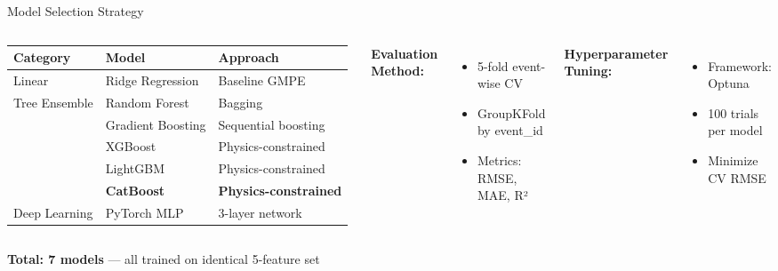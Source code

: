 \documentclass[aspectratio=169,11pt]{beamer}
\begin{document}
\begin{frame}{Model Selection Strategy}
\begin{columns}[T]
\begin{table}
\centering
\small
\begin{tabular}{@{}lll@{}}
\toprule
\textbf{Category} & \textbf{Model} & \textbf{Approach} \\
\midrule
Linear & Ridge Regression & Baseline GMPE \\[0.2cm]
\midrule
\multirow{5}{*}{Tree Ensemble} & Random Forest & Bagging \\
& Gradient Boosting & Sequential boosting \\
& XGBoost & Physics-constrained \\
& LightGBM & Physics-constrained \\
& \textbf{CatBoost} & \textbf{Physics-constrained} \\[0.2cm]
\midrule
Deep Learning & PyTorch MLP & 3-layer network \\
\bottomrule
\end{tabular}
\end{table}

\textbf{Evaluation Method:}
\begin{itemize}
    \item 5-fold event-wise CV
    \item GroupKFold by event\_id
    \item Metrics: RMSE, MAE, R²
\end{itemize}

\vspace{0.3cm}
\textbf{Hyperparameter Tuning:}
\begin{itemize}
    \item Framework: Optuna
    \item 100 trials per model
    \item Minimize CV RMSE
\end{itemize}
\end{columns}

\vspace{0.3cm}
\centering
\textbf{Total: 7 models} — all trained on identical 5-feature set
\end{frame}
\end{document}
